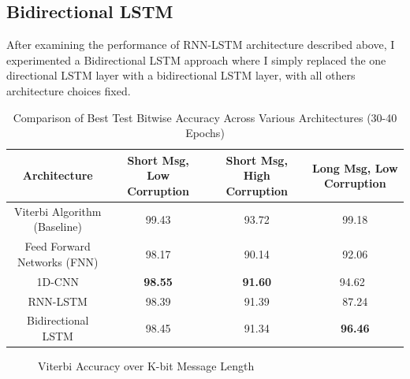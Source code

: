 \documentclass[10pt,twocolumn,letterpaper]{article}
\begin{document}
\subsection{Bidirectional LSTM}

After examining the performance of RNN-LSTM architecture described above, I experimented a Bidirectional LSTM approach where I simply replaced the one directional LSTM layer with a bidirectional LSTM layer, with all others architecture choices fixed.



\begin{table}
\begin{center}
\begin{tabular}{|c|c|c|c|}
\hline
Architecture & Short Msg, Low Corruption & 
Short Msg, High Corruption & Long Msg, Low Corruption \\
\hline\hline
Viterbi Algorithm (Baseline) & 99.43 & 93.72 & 99.18  \\
\hline
Feed Forward Networks (FNN) & 98.17 & 90.14 & 92.06  \\
1D-CNN & \textbf{98.55} & \textbf{91.60} & 94.62\  \\
RNN-LSTM & 98.39 & 91.39 & 87.24  \\
Bidirectional LSTM & 98.45 & 91.34 & \textbf{96.46}  \\
\hline
\end{tabular}
\end{center}
\caption{Comparison of Best Test Bitwise Accuracy Across Various Architectures (30-40 Epochs)}
\end{table}


\begin{figure}[t]
\begin{center}
\end{center}
   \caption{Viterbi Accuracy over K-bit Message Length}
\end{figure}
\end{document}
